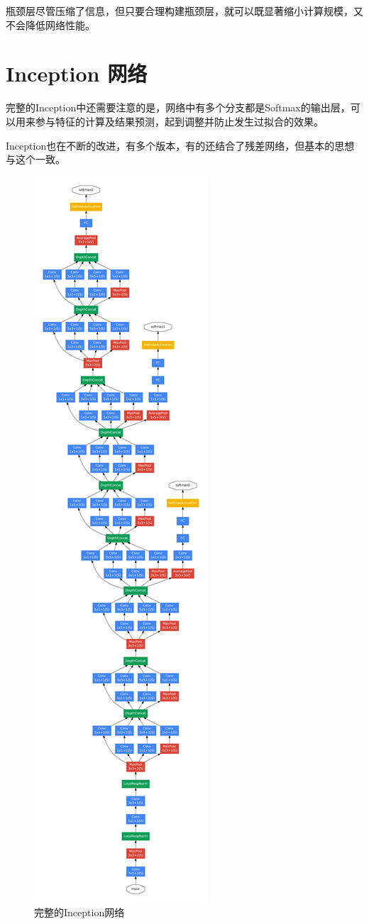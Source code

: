 \documentclass[../../main.tex]{subfiles}
\begin{document}
\begin{refsection}
瓶颈层尽管压缩了信息，但只要合理构建瓶颈层，就可以既显著缩小计算规模，又不会降低网络性能。

\section{Inception 网络}
完整的Inception中还需要注意的是，网络中有多个分支都是Softmax的输出层，可以用来参与特征的计算及结果预测，起到调整并防止发生过拟合的效果。

Inception也在不断的改进，有多个版本，有的还结合了残差网络，但基本的思想与这个一致。
\begin{figure}[p]
    \centering
    \includegraphics[height=\textheight]{./img/inception-overall.pdf}
    \caption{完整的Inception网络}
\end{figure}


\end{refsection}
\end{document}
